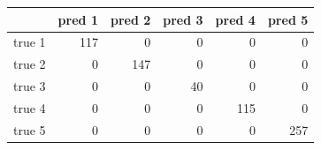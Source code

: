 \begin{tabular}{lrrrrr}
\toprule
 & pred 1 & pred 2 & pred 3 & pred 4 & pred 5 \\
\midrule
true 1 & 117 & 0 & 0 & 0 & 0 \\
true 2 & 0 & 147 & 0 & 0 & 0 \\
true 3 & 0 & 0 & 40 & 0 & 0 \\
true 4 & 0 & 0 & 0 & 115 & 0 \\
true 5 & 0 & 0 & 0 & 0 & 257 \\
\bottomrule
\end{tabular}
